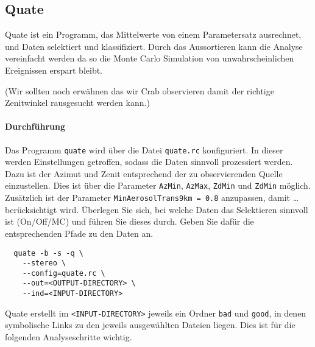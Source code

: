 \subsection{Quate}%
\label{sub:quate}

Quate ist ein Programm,
das Mittelwerte von einem Parametersatz ausrechnet,
und Daten selektiert und klassifiziert.
Durch das Aussortieren kann die Analyse vereinfacht werden da so die Monte Carlo
Simulation von unwahrscheinlichen Ereignissen erspart bleibt.

{\color{red}(Wir sollten noch erwähnen das wir Crab observieren damit der richtige Zenitwinkel rausgesucht werden kann.)}

\paragraph{Durchführung}%
Das Programm \texttt{quate} wird über die
Datei \texttt{quate.rc} konfiguriert.
In dieser werden Einstellungen getroffen,
sodass die Daten sinnvoll prozessiert werden.
Dazu ist der Azimut und Zenit entsprechend der zu
observierenden Quelle einzustellen.
Dies ist über die Parameter \texttt{AzMin},
\texttt{AzMax}, \texttt{ZdMin} und \texttt{ZdMin}
möglich.
Zusätzlich ist der Parameter
\texttt{MinAerosolTrans9km = 0.8} anzupassen,
damit {\color{red}\ldots} berücksichtigt wird.
Überlegen Sie sich,
bei welche Daten das Selektieren sinnvoll ist
(On/Off/MC)
und führen Sie dieses durch.
Geben Sie dafür die entsprechenden Pfade zu den Daten an.

\begin{lstlisting}
  quate -b -s -q \
    --stereo \
    --config=quate.rc \
    --out=<OUTPUT-DIRECTORY> \
    --ind=<INPUT-DIRECTORY>
\end{lstlisting}

Quate erstellt im \texttt{<INPUT-DIRECTORY>}
jeweils ein Ordner \texttt{bad} und \texttt{good},
in denen symbolische Links zu den jeweils ausgewählten Dateien liegen.
Dies ist für die folgenden Analyseschritte wichtig.
